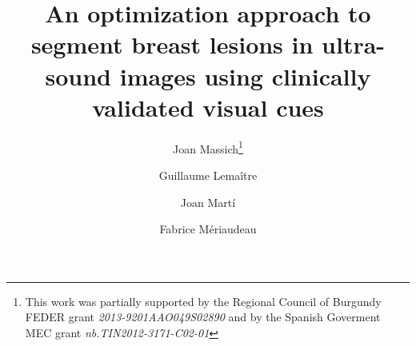 \title{ An optimization approach to segment breast lesions in ultra-sound images using clinically validated visual cues }
%
\author{
  Joan Massich\thanks{This work was partially supported by the Regional
                      Council of Burgundy FEDER grant \emph{2013-9201AAO049S02890}
                      and by the Spanish Goverment MEC grant
                      \emph{nb.TIN2012-3171-C02-01}}
  \and Guillaume Lema\^{i}tre
  \and Joan Mart\'{i}
  \and Fabrice M\'{eriaudeau}
}
%
%
%
